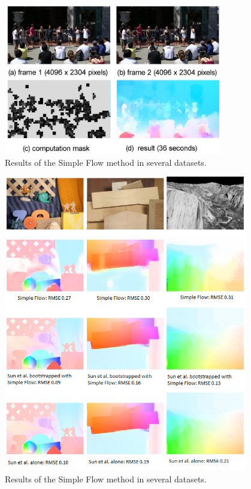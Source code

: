    \begin{figure}[tbhp]
      \centering
      \includegraphics[width=0.85\textwidth]{../images/simpleflow.png}
      \caption{  Results of the Simple Flow method in several datasets. }
      \label{simple_of_m}
   \end{figure}

   \begin{figure}[tbhp]
      \centering
      \includegraphics[width=0.95\textwidth]{../images/simpleoptflow.png}
      \caption{  Results of the Simple Flow method in several datasets. }
      \label{simple_of}
   \end{figure}

